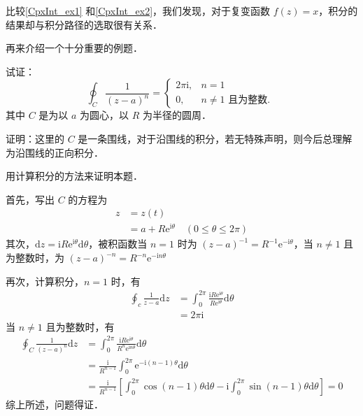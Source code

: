 比较\autoref{CpxInt_ex1} 和\autoref{CpxInt_ex2}，我们发现，对于复变函数 $f(z)=x$，积分的结果却与积分路径的选取很有关系．

再来介绍一个十分重要的例题．

\begin{example}{}
试证：
\begin{equation}
\oint_{C} \frac{1}{(z-a)^{n}}=\left\{\begin{array}{ll}2 \pi \mathrm{i}, & n=1 \\ 0, & n \neq 1 \text { 且为整数. }\end{array}\right.
\end{equation}
其中 $C$ 是为以 $a $ 为圆心，以 $R $ 为半径的圆周．

证明：这里的 $C $ 是一条围线，对于沿围线的积分，若无特殊声明，则今后总理解为沿围线的正向积分．

用计算积分的方法来证明本题．

首先，写出 $C $ 的方程为
\begin{equation}
\begin{aligned} z &=z(t) \\ &=a+R \mathrm{e}^{\mathrm{i} \theta} \quad(0 \leqslant \theta \leqslant 2 \pi) \end{aligned}
\end{equation}
其次，$\mathrm{d} z=\mathrm{i} R \mathrm{e}^{\mathrm{i} \theta} \mathrm{d} \theta$，被积函数当 $n =1$ 时为 $(z-a)^{-1}=R^{-1} \mathrm{e}^{-\mathrm{i} \theta}$，当 $n \ne 1$ 且为整数时，为 $(z-a)^{-n}=R^{-n} \mathrm{e}^{-\mathrm{i} n \theta}$

再次，计算积分，$n=1$ 时，有
\begin{equation}
\begin{aligned} \oint_{c} \frac{1}{z-a} \mathrm{d} z &=\int_{0}^{2 \pi} \frac{\mathrm{i} R \mathrm{e}^{\mathrm{i} \theta}}{R \mathrm{e}^{\mathrm{i} \theta}} \mathrm{d} \theta \\ &=2 \pi \mathrm{i} \end{aligned}
\end{equation}
当 $n \neq 1$ 且为整数时，有
\begin{equation}
\begin{aligned} \oint_{C} \frac{1}{(z-a)^{n}} \mathrm{d} z &=\int_{0}^{2 \pi} \frac{\mathrm{i} R \mathrm{e}^{\mathrm{i} \theta}}{R^{n} \mathrm{e}^{\mathrm{i} n \theta}} \mathrm{d} \theta \\ &=\frac{\mathrm{i}}{R^{n-1}} \int_{0}^{2 \pi} \mathrm{e}^{-\mathrm{i}(n-1) \theta} \mathrm{d} \theta \\ &=\frac{\mathrm{i}}{R^{n-1}}\left[\int_{0}^{2 \pi} \cos (n-1) \theta \mathrm{d} \theta-\mathrm{i} \int_{0}^{2 \pi} \sin (n-1) \theta \mathrm{d} \theta\right]=0 \end{aligned}
\end{equation}
综上所述，问题得证．
\end{example}

